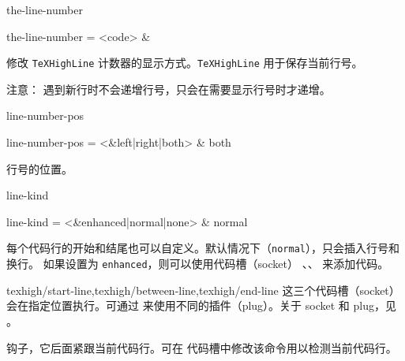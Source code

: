 \documentclass[class=article,openany]{cusdoc}[2025/09/29]
\begin{document}
\begin{keyval}[path=high]{the-line-number}
  \begin{syntax}
    the-line-number = <code> & 
  \end{syntax}
修改 \texttt{TeXHighLine} 计数器的显示方式。\texttt{TeXHighLine} 用于保存当前行号。

注意： 遇到新行时不会递增行号，只会在需要显示行号时才递增。
\end{keyval}

\begin{keyval}[path=high]{line-number-pos}
  \begin{syntax}
    line-number-pos = <&left|right|both> & both
  \end{syntax}
行号的位置。
\end{keyval}

\begin{keyval}[path=high]{line-kind}
  \begin{syntax}
    line-kind = <&enhanced|normal|none> & normal
  \end{syntax}
每个代码行的开始和结尾也可以自定义。默认情况下（\texttt{normal}），只会插入行号和换行。
如果设置为 \texttt{enhanced}，则可以使用代码槽（socket）
、、 来添加代码。
\end{keyval}

\begin{function}[module=socket point,type=socket point]{texhigh/start-line,texhigh/between-line,texhigh/end-line}
这三个代码槽（socket）会在指定位置执行。可通过  来使用不同的插件（plug）。关于 socket 和 plug，见 。
\end{function}

\begin{function}{\texhigh@start@line}
钩子，它后面紧跟当前代码行。可在  代码槽中修改该命令用以检测当前代码行。
\end{function}
\end{document}
